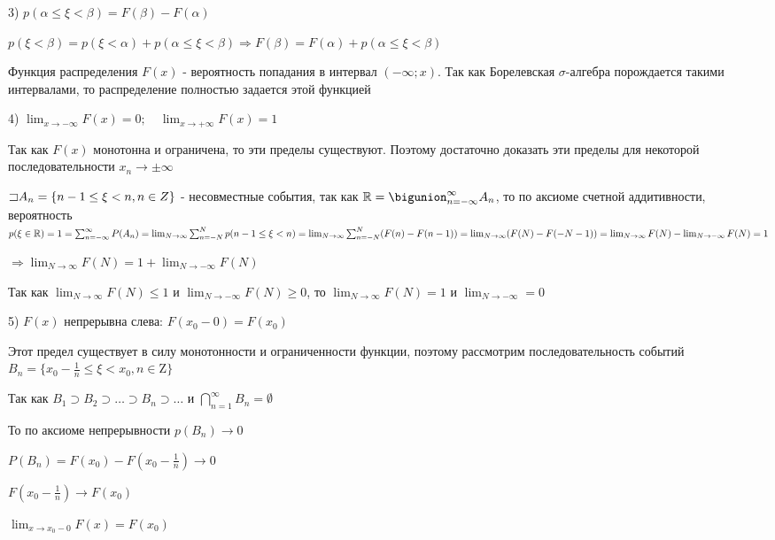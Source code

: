 \documentclass[12pt]{article}
\begin{document}
    3) $p(\alpha \leq \xi < \beta) = F(\beta) - F(\alpha)$

    \begin{MyProof}
        $p(\xi < \beta) = p(\xi < \alpha) + p(\alpha \leq \xi < \beta) \Longrightarrow F(\beta) = F(\alpha) + p(\alpha \leq \xi < \beta)$
    \end{MyProof}
    
    \Notas Функция распределения $F(x)$ - вероятность попадания в интервал $(-\infty; x)$. Так как Борелевская $\sigma$-алгебра порождается такими интервалами,
    то распределение полностью задается этой функцией

    4) $\lim_{x \to -\infty} F(x) = 0; \quad \lim_{x \to +\infty} F(x) = 1$

    \begin{MyProof}
        Так как $F(x)$ монотонна и ограничена, то эти пределы существуют. Поэтому достаточно доказать эти пределы для некоторой последовательности $x_n \to \pm \infty$

        $\mathord{\sqsupset} A_n = \{n - 1 \leq \xi < n, n \in Z\}$ - несовместные события, так как $\Real = \bigunion_{n = -\infty}^\infty A_n$, то
        по аксиоме счетной аддитивности, вероятность $p(\xi \in \mathbb{R}) = 1 = \sum_{n = -\infty}^\infty P(A_n) = \lim_{N \to \infty} \sum_{n = -N}^N p(n - 1 \leq \xi < n) = 
        \lim_{N \to \infty} \sum_{n = -N}^N (F(n) - F(n - 1)) = \lim_{N \to \infty} (F(N) - F(-N - 1)) = \lim_{N \to \infty} F(N) - \lim_{N \to -\infty} F(N) = 1$

        $\Longrightarrow \lim_{N \to \infty} F(N) = 1 + \lim_{N \to -\infty} F(N) $

        Так как $\lim_{N \to \infty} F(N) \leq 1$ и $\lim_{N \to -\infty} F(N) \geq 0$, то $\lim_{N \to \infty} F(N) = 1$ и $\lim_{N \to -\infty} = 0$
    \end{MyProof}
    
    5) $F(x)$ непрерывна слева: $F(x_0 - 0) = F(x_0)$

    \begin{MyProof}
        Этот предел существует в силу монотонности и ограниченности функции, поэтому рассмотрим последовательность событий $B_n = \{x_0 - \frac{1}{n} \leq \xi < x_0, n \in \mathrm{Z}\}$

        Так как $B_1 \supset B_2 \supset \dots \supset B_n \supset \dots$ и $\bigcap_{n = 1}^\infty B_n = \emptyset$

        То по аксиоме непрерывности $p(B_n) \to 0$

        $P(B_n) = F(x_0) - F(x_0 - \frac{1}{n}) \rightarrow 0$

        $F(x_0 - \frac{1}{n}) \to F(x_0)$

        $\lim_{x \to x_0 - 0} F(x) = F(x_0)$
    \end{MyProof}
    
\end{document}
